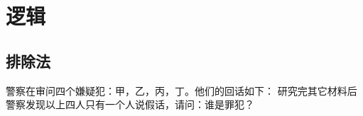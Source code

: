 
\chapter{逻辑}
\label{chap:logic}

\section{排除法}
\begin{example}
  警察在审问四个嫌疑犯：甲，乙，丙，丁。他们的回话如下：
  研究完其它材料后警察发现以上四人只有一个人说假话，请问：谁是罪犯？
\end{example}
